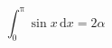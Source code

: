 \documentclass{article}
\begin{document}
\[
  \int_0^{\mathrm{\pi}} \sin x \, \mathrm{d}x = 2\alpha
\]
\end{document}
